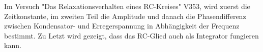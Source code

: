 Im Versuch "Das Relaxationsverhalten eines RC-Kreises" V353, wird zuerst die Zeitkonstante, im zweiten Teil die Amplitude und danach die Phasendifferenz zwischen Kondensator- und Erregerspannung in Abhängigkeit der
Frequenz bestimmt.
Zu Letzt wird gezeigt, dass das RC-Glied auch als Integrator fungieren kann.
